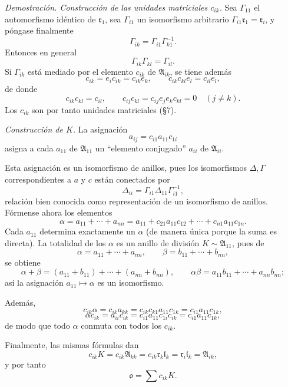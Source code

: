 \documentclass[11pt]{article}
\providecommand{\mA}{\mathfrak{A}}
\providecommand{\mo}{\mathfrak{o}}
\providecommand{\ml}{\mathfrak{l}}
\providecommand{\mr}{\mathfrak{r}}
\begin{document}
\emph{Demostración. Construcción de las unidades matriciales $c_{ik}$.} Sea $\Gamma_{11}$ el automorfismo idéntico de $\mr_1$, sea $\Gamma_{i1}$ un isomorfismo arbitrario $\Gamma_{i1}\mr_1=\mr_i$, y póngase finalmente
\[
        \Gamma_{ik}=\Gamma_{i1}\Gamma_{k1}^{-1}.
\]
Entonces en general
\[
        \Gamma_{ik}\Gamma_{kl}=\Gamma_{il}.
\]
Si $\Gamma_{ik}$ está mediado por el elemento $c_{ik}$ de $\mA_{ik}$, se tiene además
\[
        c_{ik}=e_i c_{ik}=c_{ik}e_k,
        \qquad
        c_{ik}c_{kl}e_l=c_{il}e_l,
\]
de donde
\[
        c_{ik}c_{kl}=c_{il},
        \qquad
        c_{ij}c_{kl}=c_{ij}e_j e_k c_{kl}=0\quad(j\ne k).
\]
Los $c_{ik}$ son por tanto unidades matriciales (§7).


\emph{Construcción de $K$.} La asignación
\[
        a_{ij}=c_{i1}a_{11}c_{1i}
\]
asigna a cada $a_{11}$ de $\mA_{11}$ un ``elemento conjugado'' $a_{ii}$ de $\mA_{ii}$.

Esta asignación es un isomorfismo de anillos, pues los isomorfismos $\Delta,\Gamma$ correspondientes a $a$ y $c$ están conectados por
\[
        \Delta_{ii}=\Gamma_{i1}\Delta_{11}\Gamma_{i1}^{-1},
\]
relación bien conocida como representación de un isomorfismo de anillos. Fórmense ahora los elementos
\[
        \alpha=a_{11}+\cdots+a_{nn}=a_{11}+c_{21}a_{11}c_{12}+\cdots+c_{n1}a_{11}c_{1n}.
\]
Cada $a_{11}$ determina exactamente un $\alpha$ (de manera única porque la suma es directa). La totalidad de los $\alpha$ es un anillo de división $K\sim\mA_{11}$, pues de
\[
        \alpha=a_{11}+\cdots+a_{nn},
        \qquad
        \beta=b_{11}+\cdots+b_{nn},
\]
se obtiene
\[
        \alpha+\beta=(a_{11}+b_{11})+\cdots+(a_{nn}+b_{nn}),
        \qquad
        \alpha\beta=a_{11}b_{11}+\cdots+a_{nn}b_{nn};
\]
así la asignación $a_{11}\mapsto\alpha$ es un isomorfismo.

Además,
\[
        c_{ik}\alpha=c_{ik}a_{kk}=c_{ik}c_{k1}a_{11}c_{1k}=c_{i1}a_{11}c_{1k},
\]
\[
        \alpha c_{ik}=a_{ii}c_{ik}=c_{i1}a_{11}c_{1i}c_{ik}=c_{i1}a_{11}c_{1k},
\]
de modo que todo $\alpha$ conmuta con todos los $c_{ik}$.

Finalmente, las mismas fórmulas dan
\[
        c_{ik}K=c_{ik}\mA_{kk}=c_{ik}\mr_k\ml_k=\mr_i\ml_k=\mA_{ik},
\]
y por tanto
\[
        \mo=\sum c_{ik}K.
\]
\end{document}
